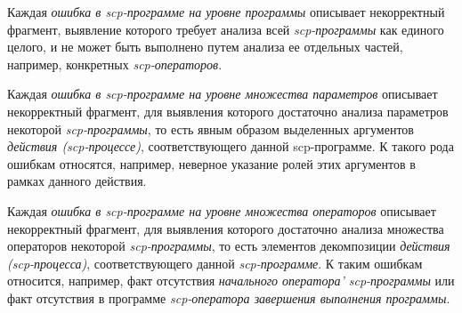 Каждая \textit{ошибка в scp-программе на уровне программы} описывает некорректный фрагмент, выявление которого требует анализа всей \textit{scp-программы} как единого целого, и не может быть выполнено путем анализа ее отдельных частей, например, конкретных \textit{scp-операторов}.

\begin{SCn}
\begin{scnindent}
\end{scnindent}
\begin{scnindent}
\end{scnindent}
\end{SCn}

Каждая \textit{ошибка в scp-программе на уровне множества параметров} описывает некорректный фрагмент, для выявления которого достаточно анализа параметров некоторой \textit{scp-программы}, то есть явным образом выделенных аргументов \textit{действия (scp-процессе)}, соответствующего данной scp-программе. К такого рода ошибкам относятся, например, неверное указание ролей этих аргументов в рамках данного действия.

\begin{SCn}
\begin{scnindent}
\end{scnindent}
\begin{scnindent}
\end{scnindent}
\end{SCn}

Каждая \textit{ошибка в scp-программе на уровне множества операторов} описывает некорректный фрагмент, для выявления которого достаточно анализа множества операторов некоторой \textit{scp-программы}, то есть элементов декомпозиции \textit{действия (scp-процесса)}, соответствующего данной \textit{scp-программе}. К таким ошибкам относится, например, факт отсутствия \textit{начального оператора' scp-программы} или факт отсутствия в программе \textit{scp-оператора завершения выполнения программы}.

